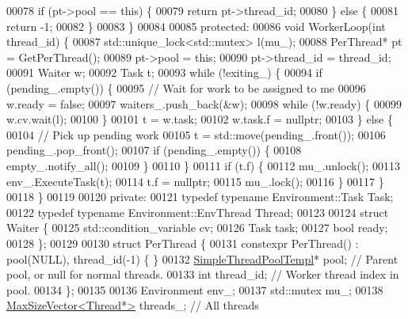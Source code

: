 \begin{DoxyCode}
00078     \textcolor{keywordflow}{if} (pt->pool == \textcolor{keyword}{this}) \{
00079       \textcolor{keywordflow}{return} pt->thread\_id;
00080     \} \textcolor{keywordflow}{else} \{
00081       \textcolor{keywordflow}{return} -1;
00082     \}
00083   \}
00084 
00085  \textcolor{keyword}{protected}:
00086   \textcolor{keywordtype}{void} WorkerLoop(\textcolor{keywordtype}{int} thread\_id) \{
00087     std::unique\_lock<std::mutex> l(mu\_);
00088     PerThread* pt = GetPerThread();
00089     pt->pool = \textcolor{keyword}{this};
00090     pt->thread\_id = thread\_id;
00091     Waiter w;
00092     Task t;
00093     \textcolor{keywordflow}{while} (!exiting\_) \{
00094       \textcolor{keywordflow}{if} (pending\_.empty()) \{
00095         \textcolor{comment}{// Wait for work to be assigned to me}
00096         w.ready = \textcolor{keyword}{false};
00097         waiters\_.push\_back(&w);
00098         \textcolor{keywordflow}{while} (!w.ready) \{
00099           w.cv.wait(l);
00100         \}
00101         t = w.task;
00102         w.task.f = \textcolor{keyword}{nullptr};
00103       \} \textcolor{keywordflow}{else} \{
00104         \textcolor{comment}{// Pick up pending work}
00105         t = std::move(pending\_.front());
00106         pending\_.pop\_front();
00107         \textcolor{keywordflow}{if} (pending\_.empty()) \{
00108           empty\_.notify\_all();
00109         \}
00110       \}
00111       \textcolor{keywordflow}{if} (t.f) \{
00112         mu\_.unlock();
00113         env\_.ExecuteTask(t);
00114         t.f = \textcolor{keyword}{nullptr};
00115         mu\_.lock();
00116       \}
00117     \}
00118   \}
00119 
00120  \textcolor{keyword}{private}:
00121   \textcolor{keyword}{typedef} \textcolor{keyword}{typename} Environment::Task Task;
00122   \textcolor{keyword}{typedef} \textcolor{keyword}{typename} Environment::EnvThread Thread;
00123 
00124   \textcolor{keyword}{struct }Waiter \{
00125     std::condition\_variable cv;
00126     Task task;
00127     \textcolor{keywordtype}{bool} ready;
00128   \};
00129 
00130   \textcolor{keyword}{struct }PerThread \{
00131     constexpr PerThread() : pool(NULL), thread\_id(-1) \{ \}
00132     \hyperlink{class_eigen_1_1_simple_thread_pool_templ}{SimpleThreadPoolTempl}* pool;  \textcolor{comment}{// Parent pool, or null for normal threads.}
00133     \textcolor{keywordtype}{int} thread\_id;                \textcolor{comment}{// Worker thread index in pool.}
00134   \};
00135 
00136   Environment env\_;
00137   std::mutex mu\_;
00138   \hyperlink{class_eigen_1_1_max_size_vector}{MaxSizeVector<Thread*>} threads\_;  \textcolor{comment}{// All threads}

\end{DoxyCode}
